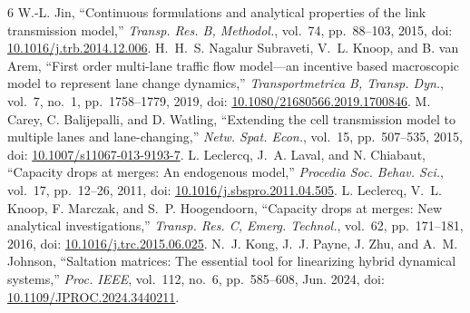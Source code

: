 \documentclass[10pt,a4paper]{article}
\begin{document}
\begin{thebibliography}{6}
\setlength{\itemsep}{0pt}\setlength{\parskip}{0pt}
 W.-L. Jin, ``Continuous formulations and analytical properties
of the link transmission model,'' \emph{Transp. Res. B, Methodol.}, vol.~74,
pp.~88--103, 2015, doi: \href{https://doi.org/10.1016/j.trb.2014.12.006}{10.1016/j.trb.2014.12.006}.
 H.~H.~S. Nagalur Subraveti, V.~L. Knoop, and B. van Arem,
``First order multi-lane traffic flow model---an incentive based macroscopic
model to represent lane change dynamics,'' \emph{Transportmetrica B, Transp.
Dyn.}, vol.~7, no.~1, pp.~1758--1779, 2019, doi:
\href{https://doi.org/10.1080/21680566.2019.1700846}{10.1080/21680566.2019.1700846}.
 M. Carey, C. Balijepalli, and D. Watling, ``Extending the cell
transmission model to multiple lanes and lane-changing,'' \emph{Netw. Spat.
Econ.}, vol.~15, pp.~507--535, 2015, doi:
\href{https://doi.org/10.1007/s11067-013-9193-7}{10.1007/s11067-013-9193-7}.
 L. Leclercq, J.~A. Laval, and N. Chiabaut,
``Capacity drops at merges: An endogenous model,'' \emph{Procedia Soc.
Behav. Sci.}, vol.~17, pp.~12--26, 2011, doi:
\href{https://doi.org/10.1016/j.sbspro.2011.04.505}{10.1016/j.sbspro.2011.04.505}.
 L. Leclercq, V.~L. Knoop, F. Marczak, and S.~P. Hoogendoorn,
``Capacity drops at merges: New analytical investigations,'' \emph{Transp.
Res. C, Emerg. Technol.}, vol.~62, pp.~171--181, 2016, doi:
\href{https://doi.org/10.1016/j.trc.2015.06.025}{10.1016/j.trc.2015.06.025}.
 N.~J. Kong, J.~J. Payne, J. Zhu, and A.~M. Johnson,
``Saltation matrices: The essential tool for linearizing hybrid dynamical
systems,'' \emph{Proc. IEEE}, vol.~112, no.~6, pp.~585--608, Jun. 2024, doi:
\href{https://doi.org/10.1109/JPROC.2024.3440211}{10.1109/JPROC.2024.3440211}.
\end{thebibliography}
\end{document}

